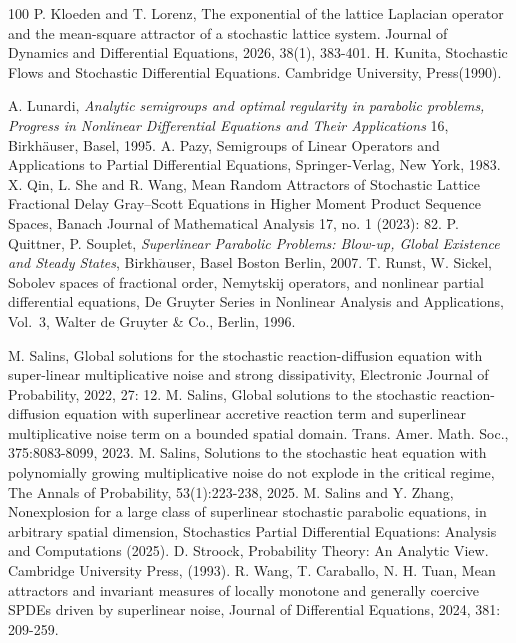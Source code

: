 \documentclass[10pt]{article}
\numberwithin{figure}{section}
\numberwithin{equation}{section}
\newcommand{\0}{{\theta}}
\begin{document}
\begin{thebibliography}{100}
 P. Kloeden and T. Lorenz, The exponential of the lattice Laplacian operator and the mean-square attractor of a stochastic lattice system. Journal of Dynamics and Differential Equations, 2026, 38(1), 383-401.
 H. Kunita, Stochastic Flows and Stochastic Differential Equations. Cambridge University, Press(1990). 

 A. Lunardi, \emph{Analytic semigroups and optimal regularity in parabolic problems, Progress in Nonlinear Differential Equations and Their Applications} 16, Birkh\"{a}user, Basel, 1995.
A. Pazy, Semigroups of Linear Operators
and Applications to Partial Differential Equations, Springer-Verlag, New York, 1983.
 X. Qin, L. She and R. Wang, Mean Random Attractors of Stochastic Lattice Fractional Delay Gray–Scott Equations in Higher Moment Product Sequence Spaces, Banach Journal of Mathematical Analysis 17, no. 1 (2023): 82.
 P. Quittner, P. Souplet, \emph{Superlinear Parabolic Problems: Blow-up, Global Existence and Steady States}, Birkh$\ddot{a}$user, Basel Boston Berlin, 2007.  
 T. Runst, W. Sickel, Sobolev spaces of fractional order, Nemytskij operators, and nonlinear partial differential equations, De Gruyter Series in Nonlinear Analysis and Applications, Vol.~3, Walter de Gruyter \& Co., Berlin, 1996.

 M. Salins, Global solutions for the stochastic reaction-diffusion equation with super-linear multiplicative noise and strong dissipativity, Electronic Journal of Probability, 2022, 27: 12.
 M. Salins, Global solutions to the stochastic reaction-diffusion equation with superlinear accretive reaction term and superlinear multiplicative noise term on a bounded spatial domain. Trans. Amer. Math. Soc., 375:8083-8099, 2023.
M. Salins, Solutions to the stochastic heat equation with polynomially growing
multiplicative noise do not explode in the critical regime, The Annals of Probability,
53(1):223-238, 2025.
 M. Salins and Y. Zhang, Nonexplosion for a large class of superlinear stochastic parabolic equations, in arbitrary spatial dimension, Stochastics Partial Differential Equations: Analysis and Computations (2025).
 D. Stroock, Probability Theory: An Analytic View. Cambridge University Press,  (1993).
 R. Wang, T. Caraballo, N. H. Tuan, Mean attractors and invariant measures of locally monotone and generally coercive SPDEs driven by superlinear noise, Journal of Differential Equations, 2024, 381: 209-259.


\end{thebibliography}
\end{document}

